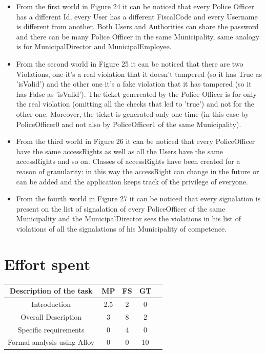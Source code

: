 \documentclass{article}
\begin{document}
\begin{itemize}
    \item From the first world in Figure 24 it can be noticed that every Police Officer has
a different Id, every User has a different FiscalCode and every Username is
different from another. Both Users and Authorities can share the password and
there can be many Police Officer in the same Municipality, same analogy is for
MunicipalDirector and MunicipalEmployee.

    \item From the second world in Figure 25 it can be noticed that there are two
Violations, one it's a real violation that it doesn't tampered (so it has True
as 'isValid') and the other one it's a fake violation that it has tampered (so
it has False as 'isValid'). The ticket genereated by the Police Officer is for
only the real violation (omitting all the checks that led to 'true') and not for
the other one. Moreover, the ticket is generated only one time (in this case by
PoliceOfficer0 and not also by PoliceOfficer1 of the same Municipality).

    \item From the third world in Figure 26 it can be noticed that every PoliceOfficer have
the same accessRights as well as all the Users have the same accessRights and so
on. Classes of accessRights have been created for a reason of granularity: in
this way the accessRight can change in the future or can be added and the
application keeps track of the privilege of everyone.

    \item From the fourth world in Figure 27 it can be noticed that every signalation is
present on the list of signalation of every PoliceOfficer of the same
Municipality and the MunicipalDirector sees the violations in his list of
violations of all the signalations of his Municipality of competence.
\end{itemize}

\newpage
\section{Effort spent}
\begin{center}
    \begin{tabular}{|c|c|c|c|c|}
        \hline
        \textbf{Description of the task} & \textbf{MP} & \textbf{FS} &
        \textbf{GT} \\
        \hline
        Introduction                    & 2.5   & 2     & 0     \\
        Overall Description             & 3     & 8     & 2     \\
        Specific requirements           & 0     & 4     & 0     \\
        Formal analysis using Alloy     & 0     & 0     & 10    \\
        \hline
    \end{tabular}
\end{center}

    
\end{document}
